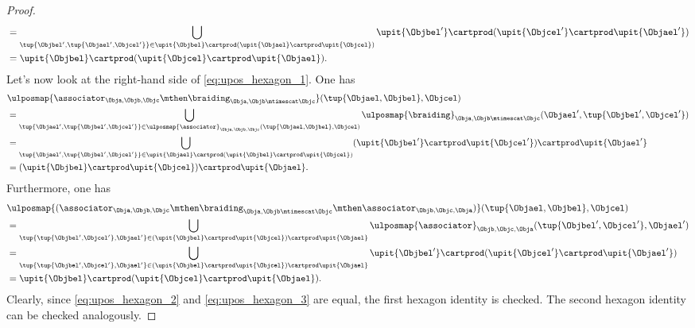 \begin{proof}
\begin{equation}
\begin{aligned}
&=\bigcup_{\tup{\Objbel',\tup{\Objael',\Objcel'}}\in \upit\{\Objbel\} \cartprod (\upit \{\Objael\}\cartprod \upit\{ \Objcel\})} \upit\{\Objbel'\}\cartprod (\upit\{\Objcel'\}\cartprod \upit\{\Objael'\})\\
&=\upit\{\Objbel\} \cartprod (\upit \{\Objcel\}\cartprod \upit\{ \Objael\}).
    \end{aligned}
    \end{equation}
Let's now look at the right-hand side of \cref{eq:upos_hexagon_1}. One has
\begin{equation*}
\begin{aligned}
&\ulposmap{\associator_{\Obja,\Objb,\Objc} \mthen \braiding_{\Obja,\Objb\mtimescat \Objc}}(\tup{\Objael,\Objbel},\Objcel)\\
&=\bigcup_{\tup{\Objael',\tup{\Objbel',\Objcel'}}\in \ulposmap{\associator}_{\Obja,\Objb,\Objc}(\tup{\Objael,\Objbel},\Objcel)}\ulposmap{\braiding}_{\Obja,\Objb\mtimescat\Objc}(\Objael',\tup{\Objbel',\Objcel'})\\
&=\bigcup_{\tup{\Objael',\tup{\Objbel',\Objcel'}}\in \upit\{\Objael\} \cartprod (\upit \{ \Objbel\}\cartprod \upit\{ \Objcel\})} (\upit\{\Objbel'\} \cartprod \upit \{ \Objcel'\})\cartprod \upit\{ \Objael'\}\\
&=(\upit\{\Objbel\} \cartprod \upit \{ \Objcel\})\cartprod \upit\{ \Objael\}.
\end{aligned}
\end{equation*}
Furthermore, one has
\begin{equation}
\label{eq:upos_hexagon_3}
\begin{aligned}
&\ulposmap{(\associator_{\Obja,\Objb,\Objc} \mthen \braiding_{\Obja,\Objb\mtimescat \Objc}\mthen \associator_{\Objb,\Objc,\Obja})}(\tup{\Objael,\Objbel},\Objcel)\\
&=\bigcup_{\tup{\tup{\Objbel',\Objcel'},\Objael'}\in (\upit\{\Objbel\} \cartprod \upit \{ \Objcel\})\cartprod \upit\{ \Objael\}}\ulposmap{\associator}_{\Objb,\Objc,\Obja}(\tup{\Objbel',\Objcel'},\Objael')\\
&=\bigcup_{\tup{\tup{\Objbel',\Objcel'},\Objael'}\in (\upit\{\Objbel\} \cartprod \upit \{ \Objcel\})\cartprod \upit\{ \Objael\}}\upit\{\Objbel'\}\cartprod (\upit\{\Objcel'\}\cartprod \upit\{\Objael'\})\\
&=\upit\{\Objbel\} \cartprod (\upit \{\Objcel\}\cartprod \upit\{ \Objael\}).
\end{aligned}
\end{equation}
Clearly, since \cref{eq:upos_hexagon_2} and \cref{eq:upos_hexagon_3} are equal, the first hexagon identity is checked.
The second hexagon identity can be checked analogously.
\end{proof}

